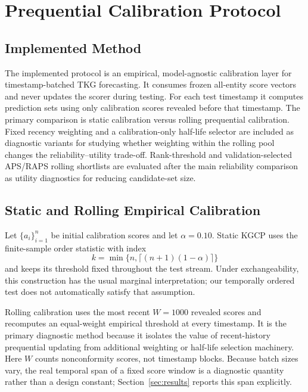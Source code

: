 \documentclass[information,article,submit,oneauthor,pdftex]{Definitions/mdpi}
\begin{document}
\section{Prequential Calibration Protocol}
\label{sec:method}

\subsection{Implemented Method}

The implemented protocol is an empirical, model-agnostic calibration layer for
timestamp-batched TKG forecasting. It consumes frozen all-entity score vectors
and never updates the scorer during testing. For each test timestamp it computes
prediction sets using only calibration scores revealed before that timestamp.
The primary comparison is static calibration versus rolling prequential
calibration. Fixed recency weighting and a calibration-only half-life selector are
included as diagnostic variants for studying whether weighting within the
rolling pool changes the reliability--utility trade-off. Rank-threshold and
validation-selected APS/RAPS rolling shortlists are evaluated after the main
reliability comparison as utility diagnostics for reducing candidate-set size.

\subsection{Static and Rolling Empirical Calibration}

Let \(\{a_i\}_{i=1}^{n}\) be initial calibration scores and let
\(\alpha=0.10\). Static KGCP uses the finite-sample order statistic with index
\[
  k=\min\{n,\lceil(n+1)(1-\alpha)\rceil\}
\]
and keeps its threshold fixed throughout the test stream. Under exchangeability,
this construction has the usual marginal interpretation; our temporally ordered
test does not automatically satisfy that assumption.

Rolling calibration uses the most recent \(W=1000\) revealed scores and
recomputes an equal-weight empirical threshold at every timestamp. It is the
primary diagnostic method because it isolates the value of recent-history
prequential updating from additional weighting or half-life selection machinery.
Here \(W\) counts nonconformity scores, not timestamp blocks. Because batch
sizes vary, the real temporal span of a fixed score window is a diagnostic
quantity rather than a design constant; Section~\ref{sec:results} reports this
span explicitly.
\end{document}
